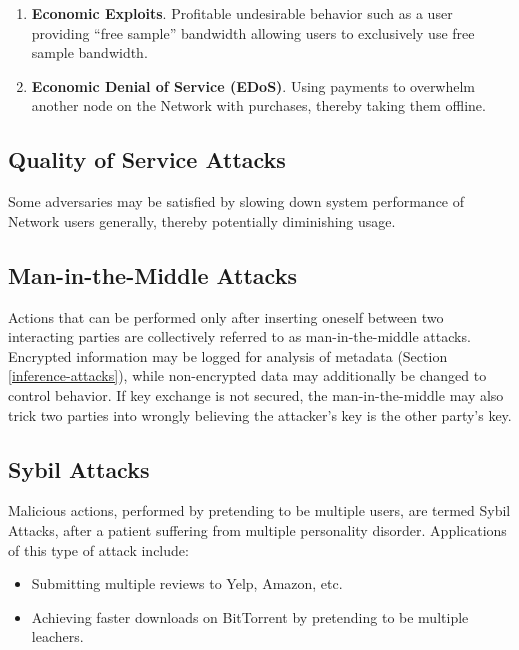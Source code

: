 \begin{enumerate}
\item \textbf{Economic Exploits}. Profitable undesirable behavior such as a user providing “free sample” bandwidth allowing users to exclusively use free sample bandwidth.
\item \textbf{Economic Denial of Service (EDoS)}. Using payments to overwhelm another node on the \Orchid{} Network with purchases, thereby taking them offline.
\end{enumerate}

\subsection{Quality of Service Attacks}
\label{qos}

Some adversaries may be satisfied by slowing down system performance of \Orchid{} Network users generally, thereby potentially diminishing usage.

\subsection{Man-in-the-Middle Attacks}
\label{mitm}

Actions that can be performed only after inserting oneself between two interacting parties are collectively referred to as man-in-the-middle attacks. Encrypted information may be logged for analysis of metadata (Section \ref{inference-attacks}), while non-encrypted data may additionally be changed to control behavior. If key exchange is not secured, the man-in-the-middle may also trick two parties into wrongly believing the attacker's key is the other party's key.

\subsection{Sybil Attacks}

Malicious actions, performed by pretending to be multiple users, are termed Sybil Attacks, after a patient suffering from multiple personality disorder. Applications of this type of attack include:

\begin{itemize}
\item Submitting multiple reviews to Yelp, Amazon, etc.
\item Achieving faster downloads on BitTorrent by pretending to be multiple leachers\cite{freeridingBittorrent}.
\end{itemize}

